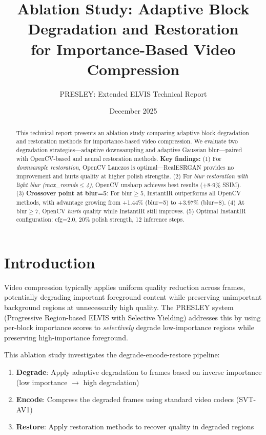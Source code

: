 \documentclass[11pt,a4paper]{article}
\title{Ablation Study: Adaptive Block Degradation and Restoration\\for Importance-Based Video Compression}
\author{PRESLEY: Extended ELVIS Technical Report}
\date{December 2025}
\begin{document}
\maketitle

\begin{abstract}
This technical report presents an ablation study comparing adaptive block degradation and restoration methods for importance-based video compression. We evaluate two degradation strategies---adaptive downsampling and adaptive Gaussian blur---paired with OpenCV-based and neural restoration methods. \textbf{Key findings:} (1) For \emph{downsample restoration}, OpenCV Lanczos is optimal---RealESRGAN provides no improvement and hurts quality at higher polish strengths. (2) For \emph{blur restoration with light blur (max\_rounds$\leq$4)}, OpenCV unsharp achieves best results (+8-9\% SSIM). (3) \textbf{Crossover point at blur=5}: For blur$\geq$5, InstantIR outperforms all OpenCV methods, with advantage growing from +1.44\% (blur=5) to +3.97\% (blur=8). (4) At blur$\geq$7, OpenCV \emph{hurts} quality while InstantIR still improves. (5) Optimal InstantIR configuration: cfg=2.0, 20\% polish strength, 12 inference steps.
\end{abstract}

\section{Introduction}

Video compression typically applies uniform quality reduction across frames, potentially degrading important foreground content while preserving unimportant background regions at unnecessarily high quality. The PRESLEY system (Progressive Region-based ELVIS with Selective Yielding) addresses this by using per-block importance scores to \emph{selectively} degrade low-importance regions while preserving high-importance foreground.

This ablation study investigates the degrade-encode-restore pipeline:
\begin{enumerate}
    \item \textbf{Degrade}: Apply adaptive degradation to frames based on inverse importance (low importance $\rightarrow$ high degradation)
    \item \textbf{Encode}: Compress the degraded frames using standard video codecs (SVT-AV1)
    \item \textbf{Restore}: Apply restoration methods to recover quality in degraded regions
\end{enumerate}
\end{document}
